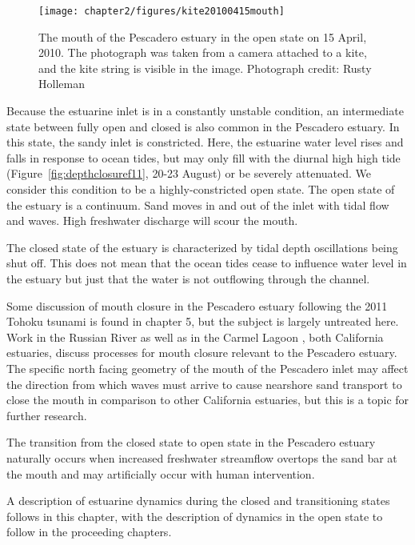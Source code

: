 \begin{figure}
	\begin{center}
		\texttt{[image: chapter2/figures/kite20100415mouth]} 
	\end{center}
\caption{The mouth of the Pescadero estuary in the open state on 15 April, 2010. The photograph was taken from a camera attached to a kite, and the kite string is visible in the image. Photograph credit: Rusty Holleman}\label{fig:kite_photos_open} \end{figure}

Because the estuarine inlet is in a constantly unstable condition, an intermediate state between fully open and closed is also common in the Pescadero estuary.  In this state, the sandy inlet is constricted. Here, the estuarine water level rises and falls in response to ocean tides, but may only fill with the diurnal high high tide (Figure~\ref{fig:depthclosuref11}, 20-23 August) or be severely attenuated. We consider this condition to be a highly-constricted open state. The open state of the estuary is a continuum. Sand moves in and out of the inlet with tidal flow and waves. High freshwater discharge will scour the mouth.

The closed state of the estuary is characterized by tidal depth oscillations being shut off. This does not mean that the ocean tides cease to influence water level in the estuary but just that the water is not outflowing through the channel.

Some discussion of mouth closure in the Pescadero estuary following the 2011 Tohoku tsunami is found in chapter 5, but the subject is largely untreated here. Work in the Russian River \parencite{behrens_russian_2012, behrens_episodic_2013} as well as in the Carmel Lagoon \parencite{rich_hydrologic_2013}, both California estuaries, discuss processes for mouth closure relevant to the Pescadero estuary. The specific north facing geometry of the mouth of the Pescadero inlet may affect the direction from which waves must arrive to cause nearshore sand transport to close the mouth in comparison to other California estuaries, but this is a topic for further research.

The transition from the closed state to open state in the Pescadero estuary naturally occurs when increased freshwater streamflow overtops the sand bar at the mouth and may artificially occur with human intervention. 

A description of estuarine dynamics during the closed and transitioning states follows in this chapter, with the description of dynamics in the open state to follow in the proceeding chapters.


